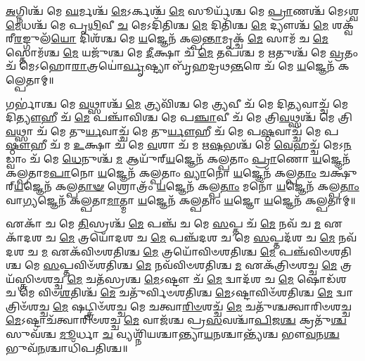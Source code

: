 
\-\ul{𑌅}\-𑌗𑍍𑌨𑌿𑌶𑍍𑌚᳴ 𑌮𑍇 \ul{𑌘}\-𑌰𑍍𑌮𑌶𑍍𑌚᳴ \ul{𑌮𑍇}\-𑌽𑌰𑍍𑌕𑌶𑍍𑌚᳴ \ul{𑌮𑍇} 𑌸𑍂𑌰𑍍𑌯᳴𑌶𑍍𑌚 𑌮𑍇 \ul{𑌪𑍍𑌰𑌾}\-𑌣𑌶𑍍𑌚᳴ 𑌮𑍇𑌽𑌶𑍍𑌵\-\ul{𑌮𑍇}\-𑌧𑌶𑍍𑌚᳴ 𑌮𑍇 𑌪𑍃\-\ul{𑌥𑌿}\-𑌵𑍀 \ul{𑌚} 𑌮𑍇𑌽𑌦𑌿᳴𑌤𑌿𑌶𑍍𑌚 \ul{𑌮𑍇} 𑌦𑌿𑌤𑌿᳴𑌶𑍍𑌚 \ul{𑌮𑍇} 𑌦𑍍𑌯𑍗𑌶𑍍𑌚᳴ \ul{𑌮𑍇} 𑌶𑌕𑍍𑌵᳴𑌰𑍀\-\ul{𑌰}\-𑌙𑍍𑌗𑍁𑌲᳴\-\ul{𑌯𑍋} 𑌦𑌿𑌶᳴𑌶𑍍𑌚 𑌮𑍇 \ul{𑌯}\-𑌜𑍍𑌞𑍇𑌨᳴ 𑌕𑌲𑍍𑌪\-\ul{𑌨𑍍𑌤𑌾}\-𑌮𑍃𑌕𑍍𑌚᳴ \ul{𑌮𑍇} 𑌸𑌾𑌮᳴ 𑌚 \ul{𑌮𑍇} 𑌸𑍍𑌤𑍋𑌮᳴𑌶𑍍𑌚 \ul{𑌮𑍇} 𑌯𑌜𑍁᳴𑌶𑍍𑌚 𑌮𑍇 \ul{𑌦𑍀}\-𑌕𑍍𑌷𑌾 𑌚᳴ \ul{𑌮𑍇} 𑌤𑌪᳴𑌶𑍍𑌚 𑌮 \ul{𑌋}\-𑌤𑍁𑌶𑍍𑌚᳴ 𑌮𑍇 \ul{𑌵𑍍𑌰}\-𑌤𑌂 𑌚᳴ 𑌮𑍇𑌽𑌹𑍋\-\ul{𑌰𑌾}\-𑌤𑍍𑌰𑌯𑍋॑\-\ul{𑌰𑍍𑌵𑍃}\-𑌷𑍍𑌟𑍍𑌯𑌾 𑌬𑍃᳴𑌹𑌦𑍍𑌰𑌥\-\ul{𑌨𑍍𑌤}\-𑌰𑍇 𑌚᳴ 𑌮𑍇 \ul{𑌯}\-𑌜𑍍𑌞𑍇𑌨᳴ 𑌕𑌲𑍍𑌪𑍇𑌤𑌾𑌮𑍍॥ 


𑌗𑌰𑍍𑌭𑌾॑𑌶𑍍𑌚 𑌮𑍇 \ul{𑌵}\-𑌥𑍍𑌸𑌾𑌶𑍍𑌚᳴ \ul{𑌮𑍇} 𑌤𑍍𑌰𑍍𑌯𑌵𑌿᳴𑌶𑍍𑌚 𑌮𑍇 \ul{𑌤𑍍𑌰𑍍𑌯}\-𑌵𑍀 𑌚᳴ 𑌮𑍇 𑌦𑌿\-\ul{𑌤𑍍𑌯}\-𑌵𑌾𑌚𑍍𑌚᳴ 𑌮𑍇 𑌦𑌿\-\ul{𑌤𑍍𑌯𑍗}\-𑌹𑍀 𑌚᳴ \ul{𑌮𑍇} 𑌪𑌞𑍍𑌚𑌾᳴𑌵𑌿𑌶𑍍𑌚 𑌮𑍇 𑌪\-\ul{𑌞𑍍𑌚𑌾}\-𑌵𑍀 𑌚᳴ 𑌮𑍇 𑌤𑍍𑌰𑌿\-\ul{𑌵}\-𑌥𑍍𑌸𑌶𑍍𑌚᳴ 𑌮𑍇 𑌤𑍍𑌰𑌿\-\ul{𑌵}\-𑌥𑍍𑌸𑌾 𑌚᳴ 𑌮𑍇 𑌤𑍁\-\ul{𑌰𑍍𑌯}\-𑌵𑌾𑌚𑍍𑌚᳴ 𑌮𑍇 𑌤𑍁\-\ul{𑌰𑍍𑌯𑍗}\-𑌹𑍀 𑌚᳴ 𑌮𑍇 𑌪\-\ul{𑌷𑍍𑌠}\-𑌵𑌾𑌚𑍍𑌚᳴ 𑌮𑍇 𑌪\-\ul{𑌷𑍍𑌠𑍗}\-𑌹𑍀 𑌚᳴ 𑌮 \ul{𑌉}\-𑌕𑍍𑌷𑌾 𑌚᳴ 𑌮𑍇 \ul{𑌵}\-𑌶𑌾 𑌚᳴ 𑌮 𑌋\-\ul{𑌷}\-𑌭𑌶𑍍𑌚᳴ 𑌮𑍇 \ul{𑌵𑍇}\-𑌹𑌚𑍍𑌚᳴ 𑌮𑍇𑌽\-\ul{𑌨}\-𑌡𑍍𑌵𑌾𑌂 𑌚᳴ 𑌮𑍇 \ul{𑌧𑍇}\-𑌨𑍁𑌶𑍍𑌚᳴ \ul{𑌮} 𑌆𑌯𑍁᳴𑌰𑍍‌\-\ul{𑌯}\-𑌜𑍍𑌞𑍇𑌨᳴ 𑌕𑌲𑍍𑌪𑌤𑌾𑌂 \ul{𑌪𑍍𑌰𑌾}\-𑌣𑍋 \ul{𑌯}\-𑌜𑍍𑌞𑍇𑌨᳴ 𑌕𑌲𑍍𑌪𑌤𑌾𑌮\-\ul{𑌪𑌾}\-𑌨𑍋 \ul{𑌯}\-𑌜𑍍𑌞𑍇𑌨᳴ 𑌕𑌲𑍍𑌪𑌤𑌾𑌂 \ul{𑌵𑍍𑌯𑌾}\-𑌨𑍋 \ul{𑌯}\-𑌜𑍍𑌞𑍇𑌨᳴ 𑌕𑌲𑍍𑌪\-\ul{𑌤𑌾𑌂} 𑌚𑌕𑍍𑌷𑍁᳴𑌰𑍍‌\-\ul{𑌯}\-𑌜𑍍𑌞𑍇𑌨᳴ 𑌕𑌲𑍍𑌪\-\ul{𑌤𑌾}\-\-\ul{𑍟} 𑌶𑍍𑌰𑍋𑌤𑍍𑌰𑌂᳴ \ul{𑌯}\-𑌜𑍍𑌞𑍇𑌨᳴ 𑌕𑌲𑍍𑌪\-\ul{𑌤𑌾𑌂} 𑌮𑌨𑍋᳴ \ul{𑌯}\-𑌜𑍍𑌞𑍇𑌨᳴ 𑌕𑌲𑍍𑌪\-\ul{𑌤𑌾𑌂} 𑌵𑌾\-\ul{𑌗𑍍𑌯}\-𑌜𑍍𑌞𑍇𑌨᳴ 𑌕𑌲𑍍𑌪𑌤𑌾\-\ul{𑌮𑌾}\-𑌤𑍍𑌮𑌾 \ul{𑌯}\-𑌜𑍍𑌞𑍇𑌨᳴ 𑌕𑌲𑍍𑌪𑌤𑌾𑌂 \ul{𑌯}\-𑌜𑍍𑌞𑍋 \ul{𑌯}\-𑌜𑍍𑌞𑍇𑌨᳴ 𑌕𑌲𑍍𑌪𑌤𑌾𑌮𑍍॥ 


𑌏𑌕𑌾᳴ 𑌚 𑌮𑍇 \ul{𑌤𑌿}\-𑌸𑍍𑌰𑌶𑍍𑌚᳴ \ul{𑌮𑍇} 𑌪𑌞𑍍𑌚᳴ 𑌚 𑌮𑍇 \ul{𑌸}\-𑌪𑍍𑌤 𑌚᳴ \ul{𑌮𑍇} 𑌨𑌵᳴ 𑌚 \ul{𑌮} 𑌏𑌕𑌾᳴𑌦𑌶 𑌚 \ul{𑌮𑍇} 𑌤𑍍𑌰𑌯𑍋᳴𑌦𑌶 𑌚 \ul{𑌮𑍇} 𑌪𑌞𑍍𑌚᳴𑌦𑌶 𑌚 𑌮𑍇 \ul{𑌸}\-𑌪𑍍𑌤𑌦᳴𑌶 𑌚 \ul{𑌮𑍇} 𑌨𑌵᳴𑌦𑌶 𑌚 \ul{𑌮} 𑌏𑌕᳴𑌵𑌿𑍞𑌶𑌤𑌿𑌶𑍍𑌚 \ul{𑌮𑍇} 𑌤𑍍𑌰𑌯𑍋᳴𑌵𑌿𑍞𑌶𑌤𑌿𑌶𑍍𑌚 \ul{𑌮𑍇} 𑌪𑌞𑍍𑌚᳴𑌵𑌿𑍞𑌶𑌤𑌿𑌶𑍍𑌚 𑌮𑍇 \ul{𑌸}\-𑌪𑍍𑌤𑌵𑌿𑍞᳴𑌶𑌤𑌿𑌶𑍍𑌚 \ul{𑌮𑍇} 𑌨𑌵᳴𑌵𑌿𑍞𑌶𑌤𑌿𑌶𑍍𑌚 \ul{𑌮} 𑌏𑌕᳴𑌤𑍍𑌰𑌿𑍞𑌶𑌚𑍍𑌚 \ul{𑌮𑍇} 𑌤𑍍𑌰𑌯᳴𑌸𑍍𑌤𑍍𑌰𑌿𑍞𑌶𑌚𑍍𑌚 \ul{𑌮𑍇} 𑌚𑌤᳴𑌸𑍍𑌰𑌶𑍍𑌚 \ul{𑌮𑍇}\-𑌽𑌷𑍍𑌟𑍗 𑌚᳴ \ul{𑌮𑍇} 𑌦𑍍𑌵𑌾𑌦᳴𑌶 𑌚 \ul{𑌮𑍇} 𑌷𑍋𑌡᳴𑌶 𑌚 𑌮𑍇 𑌵𑌿𑍞\-\ul{𑌶}\-𑌤𑌿𑌶𑍍𑌚᳴ \ul{𑌮𑍇} 𑌚𑌤𑍁᳴𑌰𑍍𑌵𑌿𑍞𑌶𑌤𑌿𑌶𑍍𑌚 \ul{𑌮𑍇}\-𑌽𑌷𑍍𑌟𑌾𑌵𑌿𑍞᳴𑌶𑌤𑌿𑌶𑍍𑌚 \ul{𑌮𑍇} 𑌦𑍍𑌵𑌾𑌤𑍍𑌰𑌿𑍞᳴𑌶𑌚𑍍𑌚 \ul{𑌮𑍇} 𑌷𑌟𑍍𑌤𑍍𑌰𑌿𑍞᳴𑌶𑌚𑍍𑌚 𑌮𑍇 𑌚𑌤𑍍𑌵𑌾\-\ul{𑌰𑌿}\-\-\ul{𑍞}\-𑌶𑌚𑍍𑌚᳴ \ul{𑌮𑍇} 𑌚𑌤𑍁᳴𑌶𑍍𑌚𑌤𑍍𑌵𑌾𑌰𑌿𑍞𑌶𑌚𑍍𑌚 \ul{𑌮𑍇}\-𑌽𑌷𑍍𑌟𑌾𑌚᳴𑌤𑍍𑌵𑌾𑌰𑌿𑍞𑌶𑌚𑍍𑌚 \ul{𑌮𑍇} 𑌵𑌾𑌜᳴𑌶𑍍𑌚 𑌪𑍍𑌰\-\ul{𑌸}\-𑌵𑌶𑍍𑌚𑌾᳴\-\ul{𑌪𑌿}\-𑌜\-\ul{𑌶𑍍𑌚} 𑌕𑍍𑌰𑌤𑍁᳴\-\ul{𑌶𑍍𑌚} 𑌸𑍁𑌵᳴𑌶𑍍𑌚 \ul{𑌮𑍂}\-𑌰𑍍𑌧𑌾 \ul{𑌚} 𑌵𑍍𑌯𑌶𑍍𑌨𑌿᳴𑌯𑌶𑍍𑌚𑌾𑌨𑍍𑌤𑍍𑌯𑌾\-\ul{𑌯}\-𑌨𑌶𑍍𑌚𑌾𑌨𑍍𑌤𑍍𑌯᳴𑌶𑍍𑌚 𑌭𑍗\-\ul{𑌵}\-𑌨\-\ul{𑌶𑍍𑌚} 𑌭𑍁𑌵᳴\-\ul{𑌨}\-𑌶𑍍𑌚𑌾𑌧𑌿᳴𑌪𑌤𑌿𑌶𑍍𑌚॥ 

